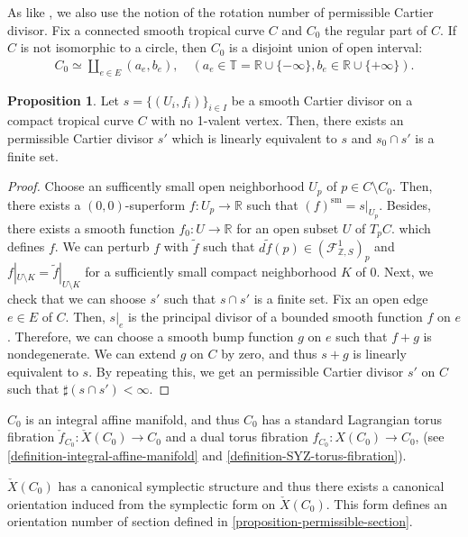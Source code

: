\documentclass[a4paper,dvipdfmx,reqno,12pt]{amsart}
\theoremstyle{definition}
\newtheorem{proposition}[theorem]{Proposition}
\numberwithin{equation}{section}
\begin{document}
As like \cite{auroux2022lagrangian},
we also use the notion of the rotation number of 
permissible Cartier divisor.
Fix a connected smooth tropical curve $C$
 and $C_0$ the 
regular part of $C$.
If $C$ is not isomorphic to a circle, then
$C_0$ is a disjoint union of open interval:
\begin{align}
  C_0\simeq \coprod_{e\in E} (a_e,b_e), \quad
(a_e\in \mathbb{T}
=\mathbb{R}\cup\{-\infty\}, b_e\in \mathbb{R}\cup\{+\infty\}).
\end{align}

\begin{proposition}
Let $s=\{(U_i,f_i)\}_{i\in I}$ be a smooth Cartier divisor on a compact
tropical curve $C$ with no 1-valent vertex.
Then, there exists
an permissible Cartier divisor $s'$ which is linearly
equivalent to $s$ and
$s_0\cap s'$ is a finite set. 
\end{proposition}
\begin{proof}

Choose an sufficently small open neighborhood 
$U_p$ of $p\in C\setminus C_0$. Then, there exists a 
$(0,0)$-superform $f\colon U_p \to \mathbb{R}$ such 
that $(f)^{\mathrm{sm}}=s|_{U_p}$. Besides, there exists 
a smooth function $f_0\colon U\to \mathbb{R}$ for 
an open subset $U$ of $T_p C$.  
which defines $f$. We can perturb $f$ with 
$\tilde{f}$ such that 
$d\tilde{f}(p)\in (\mathcal{F}_{\mathbb{Z},S}^{1})_p$
and $f|_{U\setminus K}=\tilde{f}|_{U\setminus K}$ for 
a sufficiently small compact neighborhood $K$ of $0$.  
Next, we check that we can shoose $s'$ 
such that $s\cap s'$ is a finite set.
Fix an open edge $e \in E$ of $C$.
Then, $s|_e$ is the principal divisor of a bounded smooth 
function $f$ on $e$. 
Therefore, we can choose a smooth bump function $g$ on $e$ such 
that $f+g$ is nondegenerate. We can extend $g$ on $C$ 
by zero, and thus $s+g$ is linearly equivalent to $s$.
By repeating this, we get an permissible Cartier divisor
$s'$ on $C$ such that $\sharp (s\cap s')<\infty$.
\end{proof}



$C_0$ is an integral affine manifold, 
and thus $C_0$ has a standard Lagrangian torus fibration
$\check{f}_{C_0}\colon \check{X}(C_0)\to C_0$ and
a dual torus fibration 
$f_{C_0}\colon X(C_0)\to C_0$,
(see \cref{definition-integral-affine-manifold}
and \cref{definition-SYZ-torus-fibration}).

$\check{X}(C_0)$ has a canonical symplectic structure
and thus there exists a canonical orientation induced
from the symplectic form on $\check{X}(C_0)$.
This form defines an orientation number of 
section defined in \cref{proposition-permissible-section}.
\end{document}
